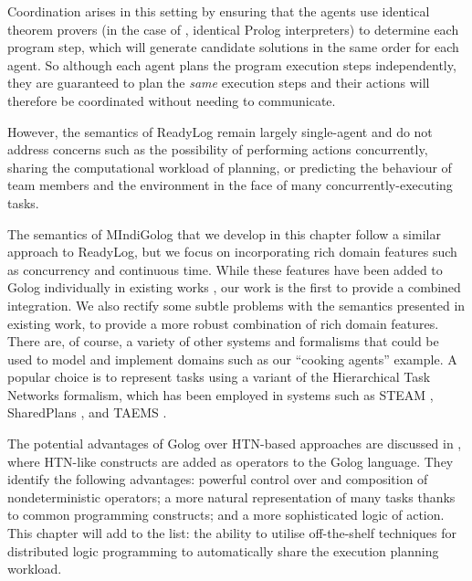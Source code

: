 Coordination arises in this setting by ensuring that the agents use
identical theorem provers (in the case of \citep{Ferrein2005readylog},
identical Prolog interpreters) to determine each program step, which
will generate candidate solutions in the same order for each agent.
So although each agent plans the program execution steps independently,
they are guaranteed to plan the \emph{same} execution steps and their
actions will therefore be coordinated without needing to communicate.

However, the semantics of ReadyLog remain largely single-agent and
do not address concerns such as the possibility of performing actions
concurrently, sharing the computational workload of planning, or predicting
the behaviour of team members and the environment in the face of many
concurrently-executing tasks.

The semantics of MIndiGolog that we develop in this chapter follow
a similar approach to ReadyLog, but we focus on incorporating rich
domain features such as concurrency and continuous time. While these
features have been added to Golog individually in existing works \citep{Reiter98seq_temp_golog,pinto99tcongolog,pirri00planning_nat_acts,reiter01kia},
our work is the first to provide a combined integration. We also rectify
some subtle problems with the semantics presented in existing work,
to provide a more robust combination of rich domain features.\\


There are, of course, a variety of other systems and formalisms that
could be used to model and implement domains such as our {}``cooking
agents'' example. A popular choice is to represent tasks using a
variant of the Hierarchical Task Networks formalism, which has been
employed in systems such as STEAM \citep{tambe97flexible_teamwork},
SharedPlans \citep{grosz96sharedplans}, and TAEMS \citep{decker95designing_coordination}.

The potential advantages of Golog over HTN-based approaches are discussed
in \citep{son00htn_golog}, where HTN-like constructs are added as
operators to the Golog language. They identify the following advantages:
powerful control over and composition of nondeterministic operators;
a more natural representation of many tasks thanks to common programming
constructs; and a more sophisticated logic of action. This chapter
will add to the list: the ability to utilise off-the-shelf techniques
for distributed logic programming to automatically share the execution
planning workload.

